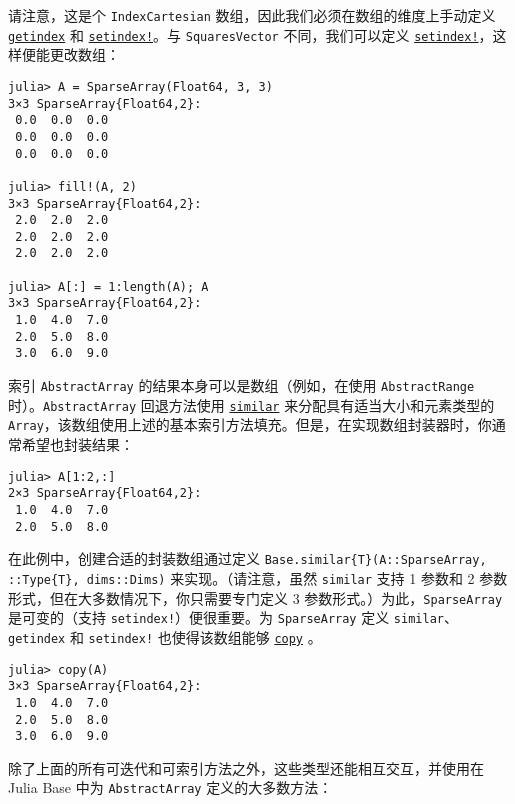 请注意，这是个 \texttt{IndexCartesian} 数组，因此我们必须在数组的维度上手动定义 \hyperlink{13720608614876840481}{\texttt{getindex}} 和 \hyperlink{1309244355901386657}{\texttt{setindex!}}。与 \texttt{SquaresVector} 不同，我们可以定义 \hyperlink{1309244355901386657}{\texttt{setindex!}}，这样便能更改数组：




\begin{verbatim}
julia> A = SparseArray(Float64, 3, 3)
3×3 SparseArray{Float64,2}:
 0.0  0.0  0.0
 0.0  0.0  0.0
 0.0  0.0  0.0

julia> fill!(A, 2)
3×3 SparseArray{Float64,2}:
 2.0  2.0  2.0
 2.0  2.0  2.0
 2.0  2.0  2.0

julia> A[:] = 1:length(A); A
3×3 SparseArray{Float64,2}:
 1.0  4.0  7.0
 2.0  5.0  8.0
 3.0  6.0  9.0
\end{verbatim}



索引 \texttt{AbstractArray} 的结果本身可以是数组（例如，在使用 \texttt{AbstractRange} 时）。\texttt{AbstractArray} 回退方法使用 \hyperlink{15525808546723795098}{\texttt{similar}} 来分配具有适当大小和元素类型的 \texttt{Array}，该数组使用上述的基本索引方法填充。但是，在实现数组封装器时，你通常希望也封装结果：




\begin{verbatim}
julia> A[1:2,:]
2×3 SparseArray{Float64,2}:
 1.0  4.0  7.0
 2.0  5.0  8.0
\end{verbatim}



在此例中，创建合适的封装数组通过定义 \texttt{Base.similar\{T\}(A::SparseArray, ::Type\{T\}, dims::Dims)} 来实现。（请注意，虽然 \texttt{similar} 支持 1 参数和 2 参数形式，但在大多数情况下，你只需要专门定义 3 参数形式。）为此，\texttt{SparseArray} 是可变的（支持 \texttt{setindex!}）便很重要。为 \texttt{SparseArray} 定义 \texttt{similar}、\texttt{getindex} 和 \texttt{setindex!} 也使得该数组能够 \hyperlink{15665284441316555522}{\texttt{copy}} 。




\begin{verbatim}
julia> copy(A)
3×3 SparseArray{Float64,2}:
 1.0  4.0  7.0
 2.0  5.0  8.0
 3.0  6.0  9.0
\end{verbatim}



除了上面的所有可迭代和可索引方法之外，这些类型还能相互交互，并使用在 Julia Base 中为 \texttt{AbstractArray} 定义的大多数方法：




